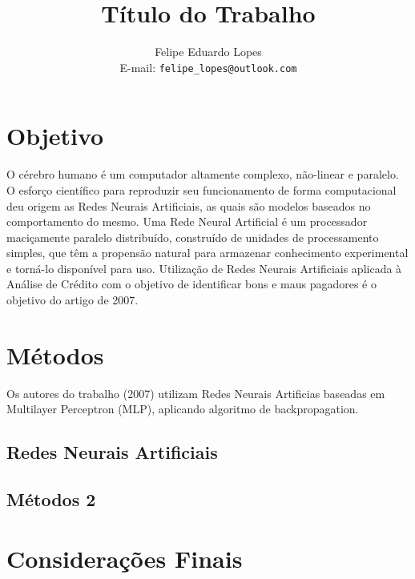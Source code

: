 \documentclass[a4paper,11pt]{article}
\title{Título do Trabalho}
\author{Felipe Eduardo Lopes\\E-mail: {\tt felipe\_lopes@outlook.com}}
\date{}
\begin{document}
\maketitle

\begin{multicols}{2}

\section{Objetivo}
O cérebro humano é um computador altamente complexo, não-linear e paralelo. O esforço científico para reproduzir seu funcionamento de forma computacional deu origem as Redes Neurais Artificiais, as quais são modelos baseados no comportamento do mesmo. Uma Rede Neural Artificial é um processador maciçamente paralelo distribuído, construído de unidades de processamento simples, que têm a propensão natural para armazenar conhecimento experimental e torná-lo disponível para uso. \cite{ref:haykin1}
Utilização de Redes Neurais Artificiais aplicada à Análise de Crédito com o objetivo de identificar bons e maus pagadores é o objetivo do artigo de 2007.

\section{Métodos}
Os autores do trabalho (2007) utilizam Redes Neurais Artificias baseadas em Multilayer Perceptron (MLP), aplicando algoritmo de backpropagation.

\subsection{Redes Neurais Artificiais}
\lipsum[3]

\subsection{Métodos 2}
\lipsum[1-1]

\section{Considerações Finais}
\lipsum[1]




\end{multicols}
\end{document}
